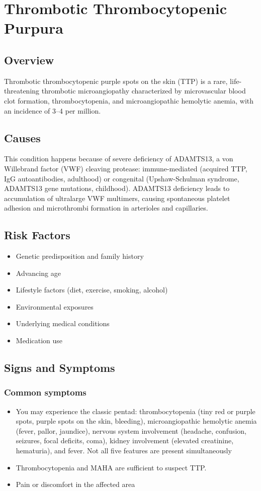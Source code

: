 \chapter{Thrombotic Thrombocytopenic Purpura}
\label{sec:Thrombotic Thrombocytopenic Purpura}

\section{Overview}
Thrombotic thrombocytopenic purple spots on the skin (TTP) is a rare, life-threatening thrombotic microangiopathy characterized by microvascular blood clot formation, thrombocytopenia, and microangiopathic hemolytic anemia, with an incidence of 3--4 per million.
\section{Causes}
This condition happens because of severe deficiency of ADAMTS13, a von Willebrand factor (VWF) cleaving protease: immune-mediated (acquired TTP, IgG autoantibodies, adulthood) or congenital (Upshaw-Schulman syndrome, ADAMTS13 gene mutations, childhood). ADAMTS13 deficiency leads to accumulation of ultralarge VWF multimers, causing spontaneous platelet adhesion and microthrombi formation in arterioles and capillaries.     
\section{Risk Factors}

\begin{itemize}[noitemsep]
  \item Genetic predisposition and family history
  \item Advancing age
  \item Lifestyle factors (diet, exercise, smoking, alcohol)
  \item Environmental exposures
  \item Underlying medical conditions
  \item Medication use
\end{itemize}
\section{Signs and Symptoms}

\subsection{Common symptoms}
\begin{itemize}[noitemsep]
  \item You may experience the classic pentad: thrombocytopenia (tiny red or purple spots, purple spots on the skin, bleeding), microangiopathic hemolytic anemia (fever, pallor, jaundice), nervous system involvement (headache, confusion, seizures, focal deficits, coma), kidney involvement (elevated creatinine, hematuria), and fever. Not all five features are present simultaneously
  \item Thrombocytopenia and MAHA are sufficient to suspect TTP.
  \item Pain or discomfort in the affected area
  \end{itemize}

